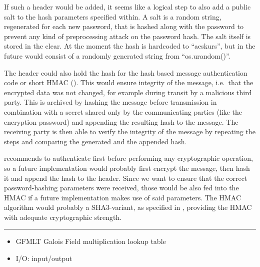 If such a header would be added, it seems like a logical step to also
add a public salt to the hash parameters specified within. A salt is a
random string, regenerated for each new password, that is hashed along
with the password to prevent any kind of preprocessing attack on the
password hash. The salt itself is stored in the clear. \cite[p. 693]{appcrypt} At
the moment the hash is hardcoded to ``aeskurs'', but in the future would
consist of a randomly generated string from ``os.urandom()''.

The header could also hold the hash for the hash based message
authentication code or short HMAC (\cite[ch. 12.2.3]{paar}). This would ensure
integrity of the message, i.e.~that the encrypted data was not changed,
for example during transit by a malicious third party. This is archived
by hashing the message before transmission in combination with a secret
shared only by the communicating parties (like the encryption-password)
and appending the resulting hash to the message. The receiving party is
then able to verify the integrity of the message by repeating the steps
and comparing the generated and the appended hash.

\cite{moxie} recommends to authenticate first before performing any
cryptographic operation, so a future implementation would probably first
encrypt the message, then hash it and append the hash to the header.
Since we want to ensure that the correct password-hashing parameters
were received, those would be also fed into the HMAC if a future
implementation makes use of said parameters. The HMAC algorithm would
probably a SHA3-variant, as specified in \cite{fips202}, providing the HMAC
with adequate cryptographic strength.

\begin{center}\rule{0.5\linewidth}{0.5pt}\end{center}

\begin{itemize}

\item
  GFMLT Galois Field multiplication lookup table
\item
  I/O: input/output
\end{itemize}
